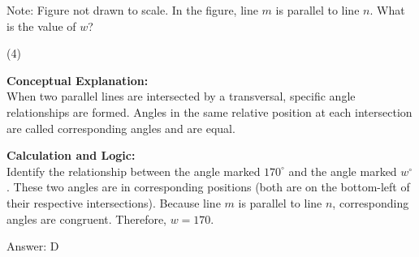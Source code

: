 \documentclass[11pt,paper=a4,answers]{exam}
\begin{document}
\begin{questions}
\pointsinrightmargin
\pointsdroppedatright
\marksnotpoints
{}
\pointformat{\boldmath\themarginpoints}
\bracketedpoints



\question
\begin{center}
\end{center}
Note: Figure not drawn to scale. In the figure, line $m$ is parallel to line $n$. What is the value of $w$?
\begin{tasks}(4)
\end{tasks}

\begin{solution}
\textbf{Conceptual Explanation:} \\
When two parallel lines are intersected by a transversal, specific angle relationships are formed. Angles in the same relative position at each intersection are called corresponding angles and are equal.

\vspace{30pt}

\textbf{Calculation and Logic:} \\
Identify the relationship between the angle marked $170^\circ$ and the angle marked $w^\circ$. These two angles are in corresponding positions (both are on the bottom-left of their respective intersections). Because line $m$ is parallel to line $n$, corresponding angles are congruent. Therefore, $w = 170$.

\vspace{30pt}

Answer: \colorbox{yellow!100}{D}
\end{solution}

\vspace{60pt}


\end{questions}
\end{document}
